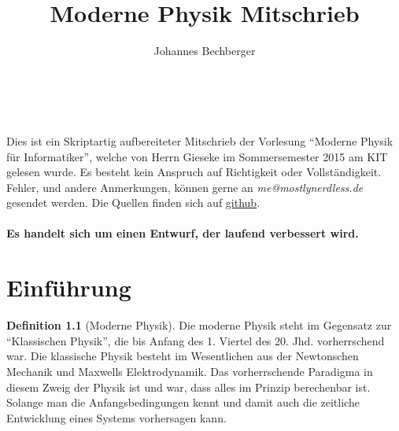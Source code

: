 \documentclass[oneside]{book}
\theoremstyle{definition}
\newtheorem*{definition*}{Definition}
\begin{document}
\title{Moderne Physik Mitschrieb}

\author{Johannes Bechberger}

\maketitle

\tableofcontents
~\\~\\
	Dies ist ein Skriptartig aufbereiteter Mitschrieb der Vorlesung "`Moderne Physik für Informatiker"', welche von Herrn Gieseke im Sommersemester 2015 am KIT gelesen wurde. Es besteht kein Anspruch auf Richtigkeit oder Vollständigkeit. Fehler, und andere Anmerkungen, können gerne an \textit{me@mostlynerdless.de} gesendet werden. Die Quellen finden sich auf \href{https://github.com/parttimenerd/Moderne-Physik}{github}.\\
	~\\
	\textbf{Es handelt sich um einen Entwurf, der laufend verbessert wird.} 

\listoftodos

\chapter{Einführung}

\begin{definition*}[Moderne Physik]
	Die moderne Physik steht im Gegensatz zur "`Klassischen Physik"', die bis Anfang des 1. Viertel des 20. Jhd. vorherrschend war. Die klassische Physik besteht im Wesentlichen aus der Newtonschen Mechanik und Maxwells Elektrodynamik.
	Das vorherrschende Paradigma in diesem Zweig der Physik ist und war, dass alles im Prinzip berechenbar ist. Solange man die Anfangsbedingungen kennt und damit auch die zeitliche Entwicklung eines Systems vorhersagen kann.
\end{definition*}
\end{document}
